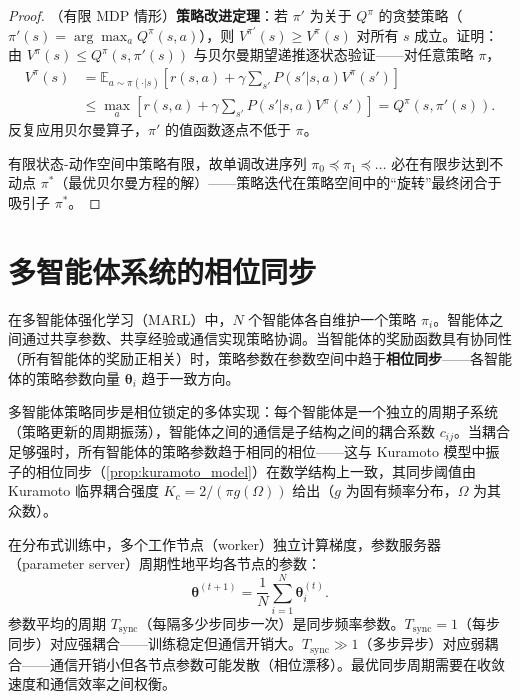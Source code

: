 \begin{proof}
（有限 MDP 情形）\textbf{策略改进定理}：若 $\pi'$ 为关于 $Q^{\pi}$ 的贪婪策略（$\pi'(s) = \arg\max_a Q^{\pi}(s,a)$），则 $V^{\pi'}(s) \ge V^{\pi}(s)$ 对所有 $s$ 成立。证明：由 $V^{\pi}(s) \le Q^{\pi}(s, \pi'(s))$ 与贝尔曼期望递推逐状态验证——对任意策略 $\pi$，
\[
\begin{aligned}
V^{\pi}(s) &= \mathbb{E}_{a \sim \pi(\cdot|s)}\left[ r(s,a) + \gamma \sum_{s'} P(s'|s,a) V^{\pi}(s') \right]\\
&\le \max_a \left[ r(s,a) + \gamma \sum_{s'} P(s'|s,a) V^{\pi}(s') \right] = Q^{\pi}(s, \pi'(s)).
\end{aligned}
\]
反复应用贝尔曼算子，$\pi'$ 的值函数逐点不低于 $\pi$。

有限状态-动作空间中策略有限，故单调改进序列 $\pi_0 \preceq \pi_1 \preceq \dots$ 必在有限步达到不动点 $\pi^*$（最优贝尔曼方程的解）——策略迭代在策略空间中的“旋转”最终闭合于吸引子 $\pi^*$。
\end{proof}

\section{多智能体系统的相位同步}

\begin{definition}[多智能体强化学习的策略同步]\label{def:multi_agent_sync}
在多智能体强化学习（MARL）中，$N$ 个智能体各自维护一个策略 $\pi_i$。智能体之间通过共享参数、共享经验或通信实现策略协调。当智能体的奖励函数具有协同性（所有智能体的奖励正相关）时，策略参数在参数空间中趋于\textbf{相位同步}——各智能体的策略参数向量 $\boldsymbol{\theta}_i$ 趋于一致方向。

多智能体策略同步是相位锁定的多体实现：每个智能体是一个独立的周期子系统（策略更新的周期振荡），智能体之间的通信是子结构之间的耦合系数 $c_{ij}$。当耦合足够强时，所有智能体的策略参数趋于相同的相位——这与 Kuramoto 模型中振子的相位同步（\cref{prop:kuramoto_model}）在数学结构上一致，其同步阈值由 Kuramoto 临界耦合强度 $K_c = 2/(\pi g(\Omega))$ 给出（$g$ 为固有频率分布，$\Omega$ 为其众数）。
\end{definition}

\begin{proposition}[参数平均的周期收敛]\label{prop:parameter_averaging}
在分布式训练中，多个工作节点（worker）独立计算梯度，参数服务器（parameter server）周期性地平均各节点的参数：
\[
\boldsymbol{\theta}^{(t+1)} = \frac{1}{N} \sum_{i=1}^{N} \boldsymbol{\theta}_i^{(t)}.
\]
参数平均的周期 $T_{\text{sync}}$（每隔多少步同步一次）是同步频率参数。$T_{\text{sync}} = 1$（每步同步）对应强耦合——训练稳定但通信开销大。$T_{\text{sync}} \gg 1$（多步异步）对应弱耦合——通信开销小但各节点参数可能发散（相位漂移）。最优同步周期需要在收敛速度和通信效率之间权衡。
\end{proposition}

